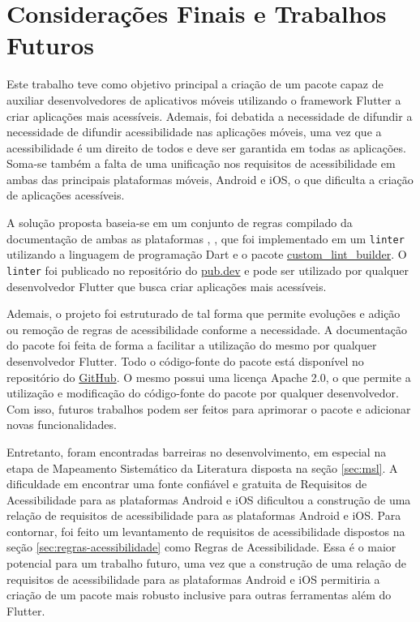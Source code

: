 \chapter{Considerações Finais e Trabalhos Futuros}

Este trabalho teve como objetivo principal a criação de um pacote capaz de auxiliar desenvolvedores de aplicativos móveis utilizando o framework Flutter a criar aplicações mais acessíveis. Ademais, foi debatida a necessidade de difundir a necessidade de difundir acessibilidade nas aplicações móveis, uma vez que a acessibilidade é um direito de todos e deve ser garantida em todas as aplicações. Soma-se também a falta de uma unificação nos requisitos de acessibilidade em ambas das principais plataformas móveis, Android e iOS, o que dificulta a criação de aplicações acessíveis.

A solução proposta baseia-se em um conjunto de regras compilado da documentação de ambas as plataformas \cite{iosaccessibility}, \cite{androidaccessibility}, que foi implementado em um \texttt{linter} utilizando a linguagem de programação Dart e o pacote \href{https://pub.dev/packages/custom_lint_builder}{custom\_lint\_builder}. O \texttt{linter} foi publicado no repositório do \href{https://pub.dev/packages/accessibility_lint}{pub.dev} e pode ser utilizado por qualquer desenvolvedor Flutter que busca criar aplicações mais acessíveis.

Ademais, o projeto foi estruturado de tal forma que permite evoluções e adição ou remoção de regras de acessibilidade conforme a necessidade. A documentação do pacote foi feita de forma a facilitar a utilização do mesmo por qualquer desenvolvedor Flutter. Todo o código-fonte do pacote está disponível no repositório do \href{https://github.com/MateuxLucax/accessibility-lint}{GitHub}. O mesmo possui uma licença Apache 2.0, o que permite a utilização e modificação do código-fonte do pacote por qualquer desenvolvedor. Com isso, futuros trabalhos podem ser feitos para aprimorar o pacote e adicionar novas funcionalidades.

Entretanto, foram encontradas barreiras no desenvolvimento, em especial na etapa de Mapeamento Sistemático da Literatura disposta na seção \ref{sec:msl}. A dificuldade em encontrar uma fonte confiável e gratuita de Requisitos de Acessibilidade para as plataformas Android e iOS dificultou a construção de uma relação de requisitos de acessibilidade para as plataformas Android e iOS. Para contornar, foi feito um levantamento de requisitos de acessibilidade dispostos na seção \ref{sec:regras-acessibilidade} como Regras de Acessibilidade. Essa é o maior potencial para um trabalho futuro, uma vez que a construção de uma relação de requisitos de acessibilidade para as plataformas Android e iOS permitiria a criação de um pacote mais robusto inclusive para outras ferramentas além do Flutter.

